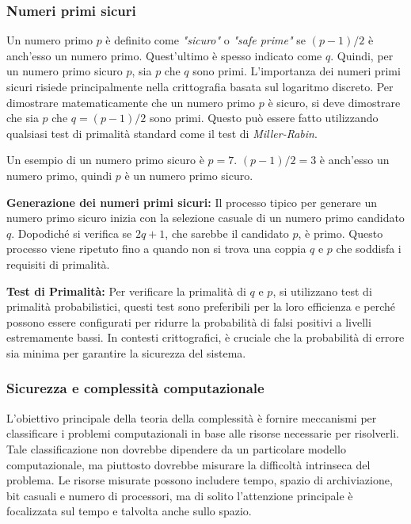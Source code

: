 \documentclass{article}
\theoremstyle{definition}
\begin{document}
\subsubsection{Numeri primi sicuri}
Un numero primo \( p \) è definito come \textit{"sicuro"} o \textit{"safe prime"} se \((p-1)/2\) è anch'esso un numero primo. Quest'ultimo è spesso indicato come \( q \). Quindi, per un numero primo sicuro \( p \), sia \( p \) che \( q \) sono primi. L'importanza dei numeri primi sicuri risiede principalmente nella crittografia basata sul logaritmo discreto. 
Per dimostrare matematicamente che un numero primo \( p \) è sicuro, si deve dimostrare che sia \( p \) che \( q = (p-1)/2 \) sono primi. Questo può essere fatto utilizzando qualsiasi test di primalità standard come il test di \textit{Miller-Rabin}.

Un esempio di un numero primo sicuro è \( p = 7 \). 
\( (p-1)/2 = 3 \) è anch'esso un numero primo, quindi \( p \) è un numero primo sicuro.

\textbf{Generazione dei numeri primi sicuri:}
Il processo tipico per generare un numero primo sicuro inizia con la selezione casuale di un numero primo candidato \( q \). Dopodiché si verifica se \( 2q+1 \), che sarebbe il candidato \( p \), è primo. Questo processo viene ripetuto fino a quando non si trova una coppia \( q \) e \( p \) che soddisfa i requisiti di primalità.

\textbf{Test di Primalità:} Per verificare la primalità di \( q \) e \( p \), si utilizzano test di primalità probabilistici, questi test sono preferibili per la loro efficienza e perché possono essere configurati per ridurre la probabilità di falsi positivi a livelli estremamente bassi. In contesti crittografici, è cruciale che la probabilità di errore sia minima per garantire la sicurezza del sistema.

\subsubsection{Sicurezza e complessità computazionale}
L'obiettivo principale della teoria della complessità è fornire meccanismi per classificare i problemi computazionali in base alle risorse necessarie per risolverli. Tale classificazione non dovrebbe dipendere da un particolare modello computazionale, ma piuttosto dovrebbe misurare la difficoltà intrinseca del problema. Le risorse misurate possono includere tempo, spazio di archiviazione, bit casuali e numero di processori, ma di solito l'attenzione principale è focalizzata sul tempo e talvolta anche sullo spazio.
\end{document}
